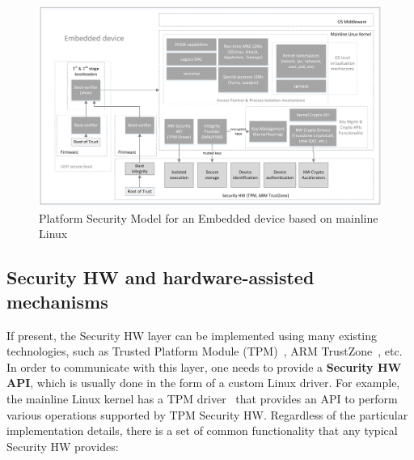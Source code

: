 \begin{figure}
	\centering
		\includegraphics[width=1\textwidth]{figures/LinuxKernelPlatSecModel.png}
	\caption{Platform Security Model for an Embedded device based on mainline Linux}
	\label{fig:platsec}
\end{figure}

\subsection{Security HW and hardware-assisted mechanisms}

If present, the Security HW layer can be implemented using many existing technologies, such as Trusted Platform Module (TPM)~\cite{tpm}, ARM TrustZone~\cite{trustzone}, etc. In order to communicate with this layer, one needs to provide a \textbf{Security HW API}, which is usually done in the form of a custom Linux driver. For example, the mainline Linux kernel has a TPM driver~\cite{tpmdriver} that provides an API to perform various operations supported by TPM Security HW. Regardless of the particular implementation details, there is a set of common functionality that any typical Security HW provides:

